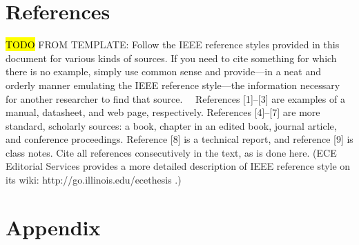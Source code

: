 \documentclass[letterpaper,10pt]{article}
\begin{document}
\begin{spacing}{1.15}
\section{References}
\hl{TODO}
FROM TEMPLATE: Follow the IEEE reference styles provided in this document for various kinds of sources. If you need to cite something for which there is no example, simply use common sense and provide—in a neat and orderly manner emulating the IEEE reference style—the information necessary for another researcher to find that source.   References [1]–[3] are examples of a manual, datasheet, and web page, respectively. References [4]–[7] are more standard, scholarly sources: a book, chapter in an edited book, journal article, and conference proceedings. Reference [8] is a technical report, and reference [9] is class notes. Cite all references
consecutively in the text, as is done here. (ECE Editorial Services provides a more detailed description of IEEE reference style on its wiki: http://go.illinois.edu/ecethesis .)

\clearpage

\clearpage
\section*{Appendix}

\end{spacing}
\end{document}
